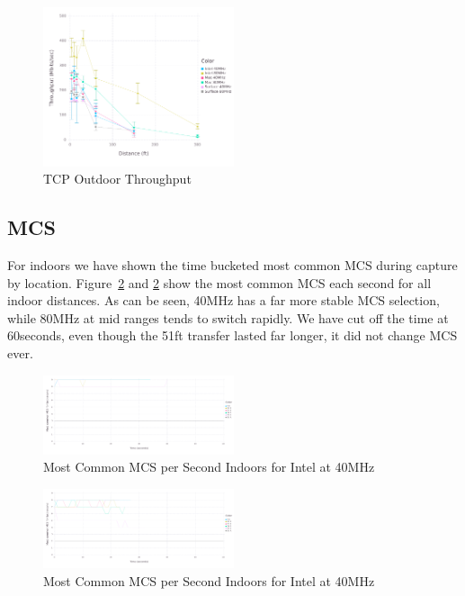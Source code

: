 \begin{figure}[!h]
\centering
\includegraphics[width=0.5\textwidth]{figures/allchip_Outside_TCP_Throughput}
\caption{TCP Outdoor Throughput}
\label{fig:outsidethru}
\end{figure}

\subsection{MCS}
For indoors we have shown the time bucketed most common MCS during
capture by location. Figure~\ref{fig:imcs40time} and
\ref{fig:imcs40time} show the most common MCS each second for all
indoor distances. As can be seen, 40MHz has a far more stable MCS
selection, while 80MHz at mid ranges tends to switch rapidly.  We have
cut off the time at 60seconds, even though the 51ft transfer lasted
far longer, it did not change MCS ever. 
\begin{figure}[!h]
\centering
\includegraphics[width=0.5\textwidth]{figures/Intel_Inside_40_MCS}
\caption{Most Common MCS per Second Indoors for Intel at 40MHz}
\label{fig:imcs40time}
\end{figure}

\begin{figure}[!h]
\centering
\includegraphics[width=0.5\textwidth]{figures/Intel_Inside_80_MCS}
\caption{Most Common MCS per Second Indoors for Intel at 40MHz}
\label{fig:imcs80time}
\end{figure}
